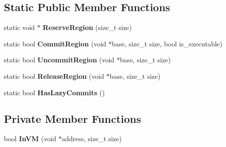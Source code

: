 \subsection*{Static Public Member Functions}
\begin{DoxyCompactItemize}
\item 
static void $\ast$ {\bfseries Reserve\+Region} (size\+\_\+t size)\hypertarget{classv8_1_1base_1_1_virtual_memory_af8552115d7a448d7b31be8500eb78a60}{}\label{classv8_1_1base_1_1_virtual_memory_af8552115d7a448d7b31be8500eb78a60}

\item 
static bool {\bfseries Commit\+Region} (void $\ast$base, size\+\_\+t size, bool is\+\_\+executable)\hypertarget{classv8_1_1base_1_1_virtual_memory_ab9ce01ce175439bc0ca119f4670144e3}{}\label{classv8_1_1base_1_1_virtual_memory_ab9ce01ce175439bc0ca119f4670144e3}

\item 
static bool {\bfseries Uncommit\+Region} (void $\ast$base, size\+\_\+t size)\hypertarget{classv8_1_1base_1_1_virtual_memory_a47201a5b2ee61dea3407880669e04d2f}{}\label{classv8_1_1base_1_1_virtual_memory_a47201a5b2ee61dea3407880669e04d2f}

\item 
static bool {\bfseries Release\+Region} (void $\ast$base, size\+\_\+t size)\hypertarget{classv8_1_1base_1_1_virtual_memory_a619bbaaca7ee0949f095e2b6f62ffb07}{}\label{classv8_1_1base_1_1_virtual_memory_a619bbaaca7ee0949f095e2b6f62ffb07}

\item 
static bool {\bfseries Has\+Lazy\+Commits} ()\hypertarget{classv8_1_1base_1_1_virtual_memory_af38432168fc0a51690a4e1c4cf50e224}{}\label{classv8_1_1base_1_1_virtual_memory_af38432168fc0a51690a4e1c4cf50e224}

\end{DoxyCompactItemize}
\subsection*{Private Member Functions}
\begin{DoxyCompactItemize}
\item 
bool {\bfseries In\+VM} (void $\ast$address, size\+\_\+t size)\hypertarget{classv8_1_1base_1_1_virtual_memory_afc66d8a4d52b1dcb45423e333f8100e5}{}\label{classv8_1_1base_1_1_virtual_memory_afc66d8a4d52b1dcb45423e333f8100e5}

\end{DoxyCompactItemize}

